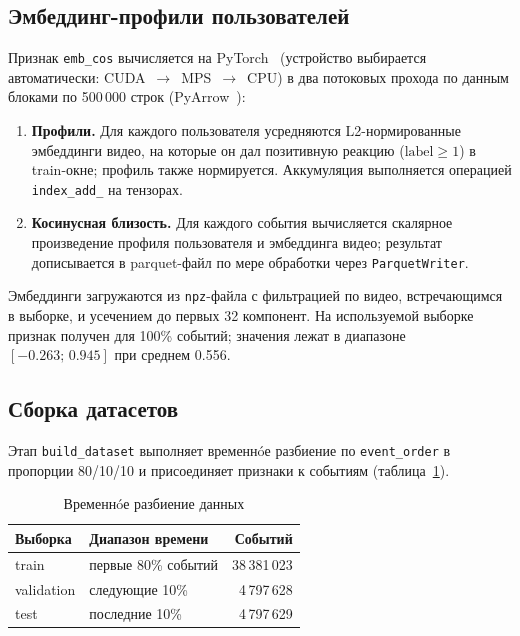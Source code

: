 \subsection{Эмбеддинг-профили пользователей}

Признак \texttt{emb\_cos} вычисляется на PyTorch~\cite{pytorch-docs} (устройство выбирается автоматически: CUDA~$\rightarrow$~MPS~$\rightarrow$~CPU) в два потоковых прохода по данным блоками по 500\,000 строк (PyArrow~\cite{pyarrow-docs}):

\begin{enumerate}
    \item \textbf{Профили.} Для каждого пользователя усредняются L2-нормированные эмбеддинги видео, на которые он дал позитивную реакцию ($\text{label} \ge 1$) в train-окне; профиль также нормируется.
    Аккумуляция выполняется операцией \texttt{index\_add\_} на тензорах.
    \item \textbf{Косинусная близость.} Для каждого события вычисляется скалярное произведение профиля пользователя и эмбеддинга видео; результат дописывается в parquet-файл по мере обработки через \texttt{ParquetWriter}.
\end{enumerate}

Эмбеддинги загружаются из \texttt{npz}-файла с фильтрацией по видео, встречающимся в выборке, и усечением до первых 32 компонент.
На используемой выборке признак получен для 100\% событий; значения лежат в диапазоне $[-0.263;\,0.945]$ при среднем 0.556.

\subsection{Сборка датасетов}

Этап \texttt{build\_dataset} выполняет временнóе разбиение по \texttt{event\_order} в пропорции 80/10/10 и присоединяет признаки к событиям (таблица~\ref{tab:splits}).

\begin{table}[H]
\centering
\caption{Временнóе разбиение данных}
\label{tab:splits}
\small
\begin{tabularx}{\textwidth}{@{}l X r@{}}
\toprule
\textbf{Выборка} & \textbf{Диапазон времени} & \textbf{Событий} \\
\midrule
train & первые 80\% событий & 38\,381\,023 \\
validation & следующие 10\% & 4\,797\,628 \\
test & последние 10\% & 4\,797\,629 \\
\bottomrule
\end{tabularx}
\end{table}


